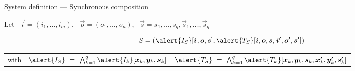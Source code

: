 \documentclass[10pt,aspectratio=149]{beamer}
\begin{document}
\begin{frame}[t]{System \alert{definition} --- Synchronous composition}
{Let \ 
$\vec i = (i_1, \ldots, i_m)$, \ 
$\vec o = (o_1, \ldots, o_n)$, \ 
$\vec s = s_1, \ldots, s_q, \vec s_1, \ldots, \vec s_q$

\[
S = (\alert{I_S}[\vec i,\vec o,\vec s], 
     \alert{T_S}[\vec i,\vec o,\vec s,\vec{i'},\vec{o'},\vec{s'}])
\]

\begin{tabular}{l@{\qquad}l@{\qquad\quad}l}
 with
 &
 $\alert{I_S} ~=~ 
 \bigwedge_{k=1}^q \alert{I_k}[\vec x_k,\vec y_k,\vec s_k]$
 &
 $\alert{T_S} ~=~ 
 \bigwedge_{k=1}^q \alert{T_k}[\vec x_k,\vec y_k,\vec s_k,\vec{x'}_k,\vec{y'}_k,\vec{s'}_k]$
\end{tabular}
}

\end{frame}

\end{document}
